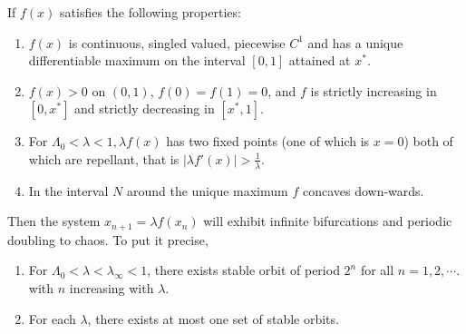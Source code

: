 \begin{thm}
	If $f(x)$ satisfies the following properties:
	\begin{enumerate}
		\item $f(x)$ is continuous, singled valued, piecewise $C^1$ and has a unique differentiable maximum on the interval $[0,1]$ attained at $x^*$.
		\item $f(x) > 0$ on $(0,1)$, $f(0) = f(1) = 0$, and $f$ is strictly increasing in $[0, x^*]$ and strictly decreasing in $[x^*, 1]$.
		\item For $\Lambda_0 < \lambda < 1, \lambda f(x)$ has two fixed points (one of which is $x = 0$) both of which are repellant, that is $|\lambda f'(x)| > \frac{1}{\lambda}$.
		\item In the interval $N$ around the unique maximum $f$ concaves down-wards.
	\end{enumerate}
	Then the system $x_{n+1} = \lambda f(x_n)$ will exhibit infinite bifurcations and periodic doubling to chaos.
	To put it precise, 
	\begin{enumerate}
		\item For $\Lambda_0 < \lambda < \lambda_{\infty} < 1$, there exists stable orbit of period $2^n$ for all $n = 1, 2, \cdots$. with $n$ increasing with $\lambda$.
		\item For each $\lambda$, there exists at most one set of stable orbits.
	\end{enumerate}
\end{thm}

